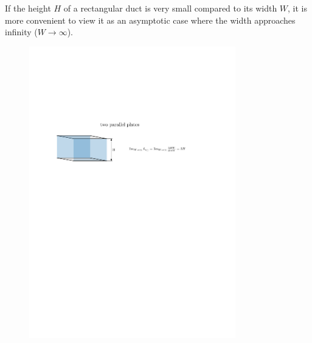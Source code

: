 If the height $H$ of a rectangular duct is very small compared to its width $W$, it is more convenient to view it as an asymptotic case where the width approaches infinity ($W \to \infty$).
\begin{figure}[H]
    \centering
    \includegraphics[width=0.8\textwidth]{src/02_foundations/fig_wetted-perimeter-plates.pdf}
    \label{fig:wetted-plates}
\end{figure}
\newpage
